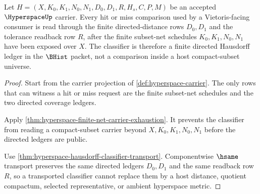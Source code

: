 \begin{theorem}
\label{thm:hyperspace-hit-miss-classifier}
Let $H=(X,K_0,K_1,N_0,N_1,D_0,D_1,R,H_s,C,P,M)$ be an accepted $\HyperspaceUp$ carrier. Every hit or miss comparison used by a Vietoris-facing consumer is read through the finite directed-distance rows $D_0,D_1$ and the tolerance readback row $R$, after the finite subset-net schedules $K_0,K_1,N_0,N_1$ have been exposed over $X$. The classifier is therefore a finite directed Hausdorff ledger in the $\BHist$ packet, not a comparison inside a host compact-subset universe.
\end{theorem}
\begin{proof}
Start from the carrier projection of \autoref{def:hyperspace-carrier}. The only rows that can witness a hit or miss request are the finite subset-net schedules and the two directed coverage ledgers.

Apply \autoref{thm:hyperspace-finite-net-carrier-exhaustion}. It prevents the classifier from reading a compact-subset carrier beyond $X,K_0,K_1,N_0,N_1$ before the directed ledgers are public.

Use \autoref{thm:hyperspace-hausdorff-classifier-transport}. Componentwise $\hsame$ transport preserves the same directed ledgers $D_0,D_1$ and the same readback row $R$, so a transported classifier cannot replace them by a host distance, quotient compactum, selected representative, or ambient hyperspace metric.
\end{proof}

